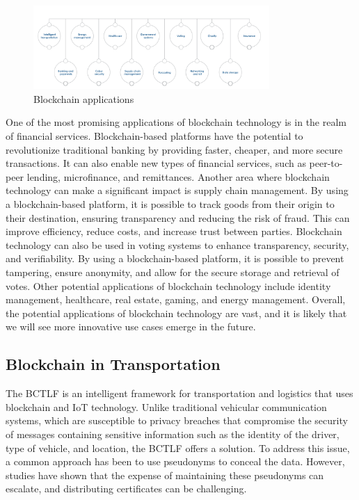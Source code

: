  \begin{figure}[H]
 \centering
  \includegraphics[width=0.8\textwidth]{blockchain applications.png}
   \caption{Blockchain applications}
  \label{fig:Blockchain applications}
\end{figure}
One of the most promising applications of blockchain technology is in the realm of financial services. Blockchain-based platforms have the potential to revolutionize traditional banking by providing faster, cheaper, and more secure transactions. It can also enable new types of financial services, such as peer-to-peer lending, microfinance, and remittances.
Another area where blockchain technology can make a significant impact is supply chain management. By using a blockchain-based platform, it is possible to track goods from their origin to their destination, ensuring transparency and reducing the risk of fraud. This can improve efficiency, reduce costs, and increase trust between parties.
Blockchain technology can also be used in voting systems to enhance transparency, security, and verifiability. By using a blockchain-based platform, it is possible to prevent tampering, ensure anonymity, and allow for the secure storage and retrieval of votes.
Other potential applications of blockchain technology include identity management, healthcare, real estate, gaming, and energy management. Overall, the potential applications of blockchain technology are vast, and it is likely that we will see more innovative use cases emerge in the future.

\subsection{Blockchain in Transportation}

The \ac{BCTLF} is an intelligent framework for transportation and logistics that uses blockchain and \ac{IoT} technology. Unlike traditional vehicular communication systems, which are susceptible to privacy breaches that compromise the security of messages containing sensitive information such as the identity of the driver, type of vehicle, and location, the \ac{BCTLF} offers a solution. To address this issue, a common approach has been to use pseudonyms to conceal the data. However, studies have shown that the expense of maintaining these pseudonyms can escalate, and distributing certificates can be challenging.


